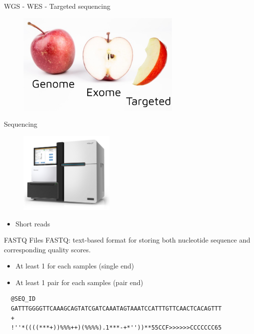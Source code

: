 \documentclass[usepdftitle=false]{beamer}
\begin{document}
\begin{frame}{WGS - WES - Targeted sequencing}
	\begin{figure}
		\includegraphics[height=5cm]{pictures/AppleSeq}
	\end{figure}
\end{frame}

\begin{frame}{Sequencing}
	\begin{figure}
		\includegraphics[height=4cm]{pictures/hiseq-x.png}
	\end{figure}
	\begin{itemize}
		\item Short reads
	\end{itemize}
\end{frame}

\begin{frame}[fragile]{FASTQ Files}
	FASTQ: text-based format for storing both nucleotide sequence and corresponding quality scores.
	\pause

	\begin{itemize}
		\item At least 1 for each samples (single end)
		\pause
		\item At least 1 pair for each samples (pair end)
	\end{itemize}

	\pause
	\begin{verbatim}
  @SEQ_ID
  GATTTGGGGTTCAAAGCAGTATCGATCAAATAGTAAATCCATTTGTTCAACTCACAGTTT
  +
  !''*((((***+))%%%++)(%%%%).1***-+*''))**55CCF>>>>>>CCCCCCC65
	\end{verbatim}

\end{frame}
\end{document}

